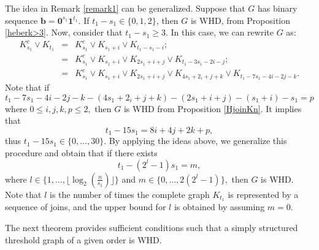 \documentclass[preprint]{elsarticle}
\begin{document}
The idea in Remark \ref{remark1} can be generalized. Suppose that $G$ has binary sequence $\mathbf{b}=\mathbf{0}^{s_1} \mathbf{1}^{t_1}.$ If $t_1 - s_1 \in \{0,1,2\}$, then $G$ is WHD, from Proposition \ref{heberk>3}. Now, consider that $t_1 - s_1 \geq 3.$ In this case, we can rewrite $G$ as:
\begin{eqnarray}
    K_{s_1}^{c} \vee K_{t_1} &=& K_{s_1}^{c} \vee K_{s_1 + i} \vee K_{t_1-s_1-i}; \nonumber  \\
    &=& K_{s_1}^{c} \vee K_{s_1 + i} \vee K_{2s_1 + i + j} \vee K_{t_1-3s_1-2i-j}; \nonumber \\
    &=& K_{s_1}^{c} \vee K_{s_1 + i} \vee K_{2s_1 + i + j} \vee K_{4s_1+2_i+j+k} \vee K_{t_1-7s_1-4i-2j-k}. \nonumber 
\end{eqnarray}
Note that if 
$$t_1-7s_1-4i-2j-k - (4s_1+2_i+j+k) - (2s_1 + i + j) - (s_1 + i) - s_1 = p$$
where $ 0\le i, j, k, p \le 2,$ then $G$ is WHD from Proposition \ref{HjoinKn}. It implies that 
$$t_1-15s_1 = 8i+4j+2k+p,$$ thus $t_1 - 15 s_1 \in \{0, \ldots, 30\}.$
By applying the ideas above, we generalize this procedure and obtain that if there exists 
$$t_1-(2^l-1)s_1 = m,$$
where $l \in \{1, \ldots, \lfloor\log_2(\frac{n}{s_1})\rfloor \}$ and $m \in \{0,\ldots,2(2^l-1)\},$ then $G$ is WHD. Note that $l$ is the number of times the complete graph $K_{t_1}$ is represented by a sequence of joins, and the upper bound for $l$ is obtained by assuming $m=0.$ 

The next theorem provides sufficient conditions such that a simply structured threshold graph of a given order is WHD.
\end{document}
